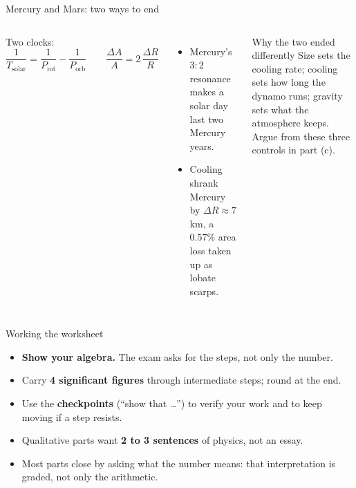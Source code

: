\documentclass[aspectratio=169, 11pt]{beamer}
\begin{document}
\begin{frame}{Mercury and Mars: two ways to end}
  \small
  \begin{columns}[T]
    Two clocks:
    \[
      \boxed{\frac{1}{T_\mathrm{solar}} = \frac{1}{P_\mathrm{rot}} - \frac{1}{P_\mathrm{orb}}}
      \qquad
      \frac{\Delta A}{A} = 2\,\frac{\Delta R}{R}
    \]
    \vspace{-6pt}
    \begin{itemize}
      \item Mercury's $3\!:\!2$ resonance makes a solar day last two Mercury years.
      \item Cooling shrank Mercury by $\Delta R \approx 7$ km, a $0.57\%$ area loss taken up as lobate scarps.
    \end{itemize}

    \begin{block}{Why the two ended differently}
      Size sets the cooling rate; cooling sets how long the dynamo runs; gravity sets what the atmosphere keeps. Argue from these three controls in part (c).
    \end{block}
  \end{columns}
  \vspace{-2pt}
\end{frame}

\begin{frame}{Working the worksheet}
  \begin{itemize}
    \item \textbf{Show your algebra.} The exam asks for the steps, not only the number.
    \item Carry \textbf{4 significant figures} through intermediate steps; round at the end.
    \item Use the \textbf{checkpoints} (``show that \ldots'') to verify your work and to keep moving if a step resists.
    \item Qualitative parts want \textbf{2 to 3 sentences} of physics, not an essay.
    \item Most parts close by asking what the number means: that interpretation is graded, not only the arithmetic.
  \end{itemize}
  \vskip8pt\relax
\end{frame}
\end{document}

